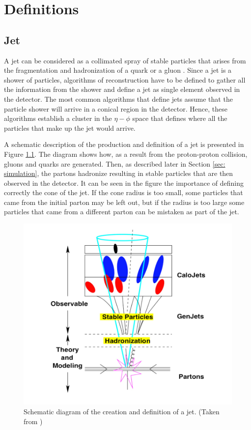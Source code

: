 \graphicspath{{Definitions/Figures/}}

\chapter{Definitions} \label{sec:definitions}

\section{Jet}

A jet can be considered as a collimated spray of stable particles that arises from the fragmentation and hadronization of a quark or a gluon \cite{Jets}. Since a jet is a shower of particles, algorithms of reconstruction have to be defined to gather all the information from the shower and define a jet as single element observed in the detector. The most common algorithms that define jets assume that the particle shower will arrive in a conical region in the detector. Hence, these algorithms establish a cluster in the $\eta-\phi$ space that defines where all the particles that make up the jet would arrive.

A schematic description of the production and definition of a jet is presented in Figure \ref{fig: jet diagram}. The diagram shows how, as a result from the proton-proton collision, gluons and quarks are generated. Then, as described later in Section \ref{sec: simulation}, the partons hadronize resulting in stable particles that are then observed in the detector. It can be seen in the figure the importance of defining correctly the cone of the jet. If the cone radius is too small, some particles that came from the initial parton may be left out, but if the radius is too large some particles that came from a different parton can be mistaken as part of the jet.

\begin{figure}[H]
\centering
\includegraphics[width = 0.7\linewidth]{jetsDiagram}
\caption{Schematic diagram of the creation and definition of a jet. (Taken from \cite{Jets})}
\label{fig: jet diagram}
\end{figure}

